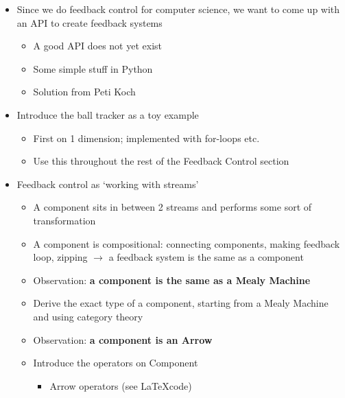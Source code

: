 \begin{itemize}
	\item Since we do feedback control for computer science, we want to come up with an API to create feedback systems
	\begin{itemize}
		\item A good API does not yet exist
		\item Some simple stuff in Python
		\item Solution from Peti Koch
	\end{itemize}
	\item Introduce the ball tracker as a toy example
	\begin{itemize}
		\item First on 1 dimension; implemented with for-loops etc.
		\item Use this throughout the rest of the Feedback Control section
	\end{itemize}
	\item Feedback control as ‘working with streams’
	\begin{itemize}
		\item A component sits in between 2 streams and performs some sort of transformation
		\item A component is compositional: connecting components, making feedback loop, zipping $\rightarrow$ a feedback system is the same as a component
		\item Observation: \textbf{a component is the same as a Mealy Machine}
		\item Derive the exact type of a component, starting from a Mealy Machine and using category theory
		\item Observation: \textbf{a component is an Arrow}
		\item Introduce the operators on Component
		\begin{itemize}
			\item Arrow operators (see \LaTeX code)

\end{itemize}
\end{itemize}
\end{itemize}
